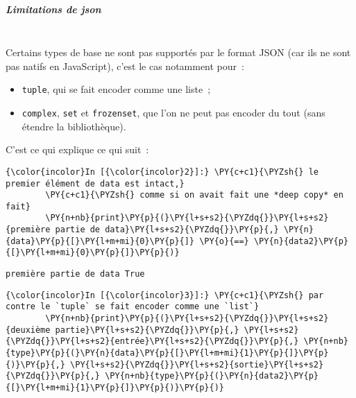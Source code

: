     \hypertarget{limitations-de-json}{%
\subparagraph{Limitations de json\\\\}\label{limitations-de-json}}

    Certains types de base ne sont pas supportés par le format JSON (car ils
ne sont pas natifs en JavaScript), c'est le cas notamment pour~:

\begin{itemize}
	\item 
	\texttt{tuple}, qui se fait encoder comme une liste~;
	\item
	\texttt{complex}, \texttt{set} et \texttt{frozenset}, que l'on ne peut
	pas encoder du tout (sans étendre la bibliothèque).
\end{itemize}

    C'est ce qui explique ce qui suit~:

    \begin{Verbatim}[commandchars=\\\{\}]
{\color{incolor}In [{\color{incolor}2}]:} \PY{c+c1}{\PYZsh{} le premier élément de data est intact,}
        \PY{c+c1}{\PYZsh{} comme si on avait fait une *deep copy* en fait}
        \PY{n+nb}{print}\PY{p}{(}\PY{l+s+s2}{\PYZdq{}}\PY{l+s+s2}{première partie de data}\PY{l+s+s2}{\PYZdq{}}\PY{p}{,} \PY{n}{data}\PY{p}{[}\PY{l+m+mi}{0}\PY{p}{]} \PY{o}{==} \PY{n}{data2}\PY{p}{[}\PY{l+m+mi}{0}\PY{p}{]}\PY{p}{)}
\end{Verbatim}


    \begin{Verbatim}[commandchars=\\\{\}]
première partie de data True

    \end{Verbatim}

    \begin{Verbatim}[commandchars=\\\{\}]
{\color{incolor}In [{\color{incolor}3}]:} \PY{c+c1}{\PYZsh{} par contre le `tuple` se fait encoder comme une `list`}
        \PY{n+nb}{print}\PY{p}{(}\PY{l+s+s2}{\PYZdq{}}\PY{l+s+s2}{deuxième partie}\PY{l+s+s2}{\PYZdq{}}\PY{p}{,} \PY{l+s+s2}{\PYZdq{}}\PY{l+s+s2}{entrée}\PY{l+s+s2}{\PYZdq{}}\PY{p}{,} \PY{n+nb}{type}\PY{p}{(}\PY{n}{data}\PY{p}{[}\PY{l+m+mi}{1}\PY{p}{]}\PY{p}{)}\PY{p}{,} \PY{l+s+s2}{\PYZdq{}}\PY{l+s+s2}{sortie}\PY{l+s+s2}{\PYZdq{}}\PY{p}{,} \PY{n+nb}{type}\PY{p}{(}\PY{n}{data2}\PY{p}{[}\PY{l+m+mi}{1}\PY{p}{]}\PY{p}{)}\PY{p}{)}
\end{Verbatim}


